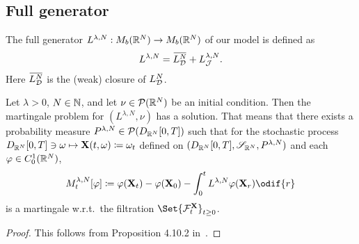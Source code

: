 \subsection{Full generator}

The full generator \(L^{\lambda, N} : M_b(\mathbb{R}^N) \to M_b(\mathbb{R}^N)\) of our model is defined as
\begin{equation}
  L^{\lambda, N} = \ol{L_{\cD}^{N}} + L_{\cJ}^{\lambda, N}.
\end{equation}
Here \(\ol{L_{\cD}^{N}}\) is the (weak) closure of \(L_{\mathcal{D}}^N\). %


\begin{theorem}\label{thm:mart-problem-sol}
  Let \(\lambda > 0\), \(N \in \mathbb{N}\), and let \(\nu \in \mathcal{P}(\mathbb{R}^N)\) be an initial condition.
  Then the martingale problem for \((L^{\lambda, N}, \nu)\) has a solution.%
  That means that there exists a probability measure \(P^{\lambda, N} \in \mathcal{P}(D_{\mathbb{R}^N}[0,T])\) such that for the stochastic process \(D_{\mathbb{R}^N}[0,T] \ni \mathbf{\omega} \mapsto \mathbf{X}(t,\mathbf{\omega}) \coloneqq \mathbf{\omega}_t\) defined on \((D_{\mathbb{R}^N}[0,T], \mathscr{S}_{\mathbb{R}^N}, P^{\lambda, N})\) and each \(\varphi \in C_0^1(\mathbb{R}^N)\),
  \begin{equation}\label{eq:M-def}
    M_t^{\lambda, N}[\varphi]
    \coloneqq \varphi(\bm{X}_t) - \varphi(\bm{X}_0) - \int_0^t L^{\lambda, N} \varphi(\bm{X}_r) \odif{r}
  \end{equation}
  is a martingale w.r.t.\ the filtration \(\Set{\cF_t^\bm{X}}_{t\geq0}\).
\end{theorem}

\begin{proof}
  This follows from Proposition 4.10.2 in~\cite{ethierMarkovProcessesCharacterization1985}.
\end{proof}







